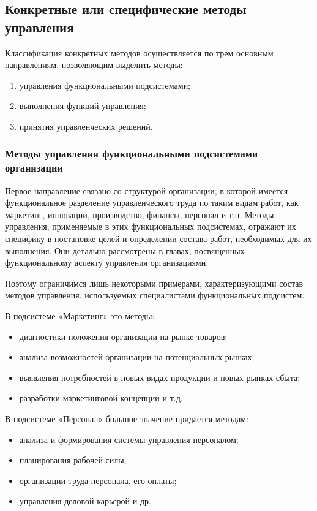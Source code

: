 \documentclass[a4paper,12pt,oneside,final]{extarticle}
\numberwithin{equation}{section}
\begin{document}
\subsection{Конкретные или специфические методы управления}
Классификация конкретных методов осуществляется по трем основным направлениям, позволяющим выделить методы:
\begin{enumerate} 
	\item управления функциональными подсистемами;
	\item выполнения функций управления;
	\item принятия управленческих решений.
\end{enumerate}

\subsubsection{Методы управления функциональными подсистемами организации}
Первое направление связано со структурой организации, в которой имеется функциональное разделение управленческого труда по таким видам работ, как маркетинг, инновации, производство, финансы, персонал и т.п. 
Методы управления, применяемые в этих функциональных подсистемах, отражают их специфику в постановке целей и определении состава работ, необходимых для их выполнения. 
Они детально рассмотрены в главах, посвященных функциональному аспекту управления организациями.

Поэтому ограничимся лишь некоторыми примерами, характеризующими состав методов управления, используемых специалистами функциональных подсистем.

В подсистеме «Маркетинг» это методы:
\begin{itemize}
	\item диагностики положения организации на рынке товаров;
	\item анализа возможностей организации на потенциальных рын­ках;
	\item выявления потребностей в новых видах продукции и новых рынках сбыта;
	\item разработки маркетинговой концепции и т.д.
\end{itemize}

В подсистеме «Персонал» большое значение придается мето­дам:
\begin{itemize}
	\item анализа и формирования системы управления персоналом;
	\item планирования рабочей силы;
	\item организации труда персонала, его оплаты;
	\item управления деловой карьерой и др.
\end{itemize}
\end{document}
